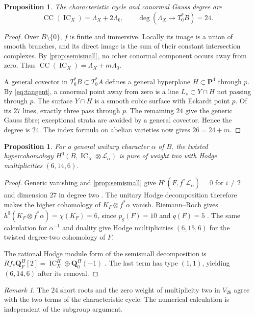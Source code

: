 \documentclass[10pt]{amsart}
\numberwithin{equation}{section}
\newtheorem{proposition}[theorem]{Proposition}
\theoremstyle{remark}
\newtheorem{remark}[theorem]{Remark}
\newcommand{\QQ}{\mathbf Q}
\newcommand{\PP}{\mathbf P}
\newcommand{\IC}{\operatorname{IC}}
\begin{document}
\begin{proposition}\label{prop:cycle}
The characteristic cycle and conormal Gauss degree are
\[
 \operatorname{CC}(\IC_X)=\Lambda_X+2\Lambda_0,
 \qquad \deg(\Lambda_X\to T_0^*B)=24.
\]
\end{proposition}
\begin{proof}
Over $B\setminus\{0\}$, $f$ is finite and immersive.  Locally its image
is a union of smooth branches, and its direct image is the sum of their
constant intersection complexes.  By \cref{prop:semismall}, no other
conormal component occurs away from zero.  Thus
$\operatorname{CC}(\IC_X)=\Lambda_X+m\Lambda_0$.

A general covector in $T_0^*B\subset T_0^*A$ defines a general hyperplane
$H\subset\PP^4$ through $p$.  By \eqref{eq:tangent}, a conormal point
away from zero is a line $L_s\subset Y\cap H$ not passing through $p$.
The surface $Y\cap H$ is a smooth cubic surface with Eckardt point $p$.
Of its $27$ lines, exactly three pass through $p$.  The remaining $24$
give the generic Gauss fibre; exceptional strata are avoided by a general
covector.  Hence the degree is $24$.  The index formula on abelian
varieties \cite[Theorem~1.3]{FK2000} now gives $26=24+m$.
\end{proof}

\begin{proposition}\label{prop:hodge}
For a general unitary character $\alpha$ of $B$, the twisted
hypercohomology $H^0(B,\IC_X\otimes\mathcal L_\alpha)$ is pure of weight
two with Hodge multiplicities $(6,14,6)$.
\end{proposition}
\begin{proof}
Generic vanishing and \cref{prop:semismall} give
$H^i(F,f^*\mathcal L_\alpha)=0$ for $i\ne2$ and dimension $27$ in
degree two \cite[Theorem~1.1]{KW2015}.  The unitary Hodge decomposition
therefore makes the higher cohomology of
$K_F\otimes f^*\alpha$ vanish.  Riemann--Roch gives
$h^0(K_F\otimes f^*\alpha)=\chi(K_F)=6$, since $p_g(F)=10$ and
$q(F)=5$ \cite{CG1972}.  The same calculation for $\alpha^{-1}$ and
duality give Hodge multiplicities $(6,15,6)$ for the twisted degree-two
cohomology of $F$.

The rational Hodge module form of the semismall decomposition is
$Rf_*\QQ_F^H[2]=\IC_X^H\oplus\QQ_0^H(-1)$
\cite{deCM2002,Saito1988}.  The last term has type $(1,1)$, yielding
$(6,14,6)$ after its removal.
\end{proof}

\begin{remark}
The $24$ short roots and the zero weight of multiplicity two in $V_{26}$
agree with the two terms of the characteristic cycle.  The numerical
calculation is independent of the subgroup argument.
\end{remark}
\end{document}
